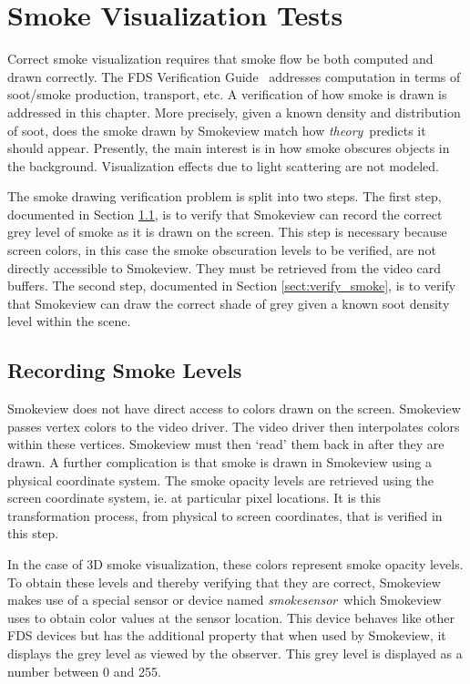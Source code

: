 \documentclass[11pt,twoside]{book}
\begin{document}
\chapter{Smoke Visualization Tests}

Correct smoke visualization requires that smoke flow be both computed and drawn correctly.
The FDS Verification Guide~\cite{FDS_Verification_Guide} addresses computation in terms of
soot/smoke production, transport, etc. A verification of how smoke is drawn is addressed in
this chapter. More precisely, given a known density and distribution of soot, does the smoke
drawn by Smokeview match how {\em theory}\ predicts it should appear.  Presently, the main
interest is in how smoke obscures objects in the background.  Visualization effects due to
light scattering are not modeled.

The smoke drawing verification problem is split into two steps. The first step,
documented in Section \ref{sect:record_smoke}, is to verify that Smokeview can record
the correct grey level of smoke as it is drawn on the screen. This step is necessary
because screen colors, in this case the smoke obscuration levels to be verified, are
not directly accessible to Smokeview. They must be retrieved from the video card
buffers. The second step, documented in Section \ref{sect:verify_smoke}, is to
verify that Smokeview can draw the correct shade of grey given a known soot density level
within the scene.
\section{Recording Smoke Levels}
\label{sect:record_smoke}

Smokeview does not have direct access to colors drawn on the screen.
Smokeview passes vertex colors to the video driver.
The video driver then interpolates colors within these vertices.
Smokeview must then `read' them back in after they are drawn.
A further complication is that smoke is drawn in Smokeview using a physical coordinate system.
The smoke opacity levels are retrieved using the screen coordinate system, ie.
at particular pixel locations.
It is this transformation process, from physical to screen coordinates,
that is verified in this step.

In the case of 3D smoke visualization, these colors represent smoke opacity levels.
To obtain these levels and thereby verifying that they are correct,
Smokeview makes use of a special sensor or device named {\em smokesensor}\
which Smokeview uses to obtain color values at the sensor location.
This device behaves like other FDS devices but has the additional
property that when used by Smokeview, it displays the grey level as viewed by the observer.
This grey level is displayed as a number between 0 and 255.
\end{document}
